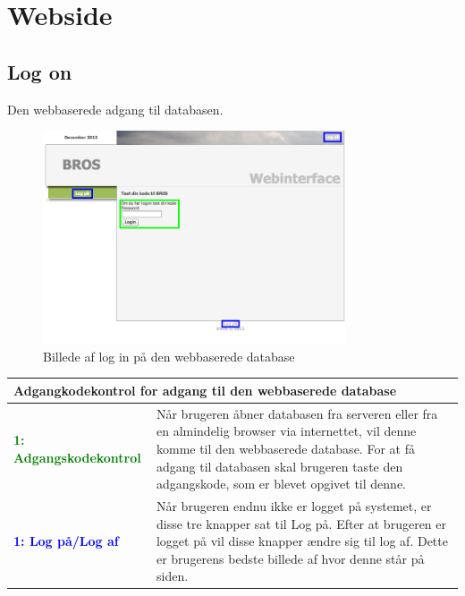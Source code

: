 \section*{Webside}
\subsection*{Log on}
Den webbaserede adgang til databasen.
\begin{figure}[H]
	\centering
	\includegraphics[width=0.8\textwidth]{billeder/database/web_forside}
	\caption{Billede af log in på den webbaserede database}
	\label{fig:web_pass}
\end{figure}

\begin{table}[H]
\begin{tabular}{l p{12.5cm}}
\multicolumn{2}{l}{Adgangkodekontrol for adgang til den webbaserede database } \\
\hline
\textcolor{green}{\textbf{1: Adgangskodekontrol}}
&Når brugeren åbner databasen fra serveren eller fra en almindelig browser via internettet, vil denne komme til den webbaserede database. For at få adgang til databasen skal brugeren taste den adgangskode, som er blevet opgivet til denne.\\
\textcolor{blue}{\textbf{1: Log på/Log af}}
&Når brugeren endnu ikke er logget på systemet, er disse tre knapper sat til Log på. Efter at brugeren er logget på vil disse knapper ændre sig til log af. Dette er brugerens bedste billede af hvor denne står på siden.
\end{tabular}
\end{table}

